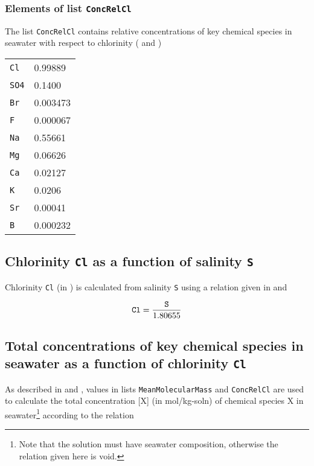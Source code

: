 \documentclass[a4paper]{article}
\begin{document}
\subsubsection{Elements of list \texttt{ConcRelCl}}
The list \texttt{ConcRelCl} contains relative concentrations of key chemical species in seawater with respect to chlorinity (\citet[chap. 5, p. 11]{DOE1994} and \citet[chap. 5, p. 10]{Dickson2007})\\
\begin{center}
\begin{tabular}{|ll|} \hline
\texttt{Cl}  & 0.99889\\
\texttt{SO4} & 0.1400\\
\texttt{Br}  & 0.003473\\
\texttt{F}   & 0.000067\\
\texttt{Na}  & 0.55661\\
\texttt{Mg}  & 0.06626\\
\texttt{Ca}  & 0.02127\\
\texttt{K}   & 0.0206\\
\texttt{Sr}  & 0.00041\\
\texttt{B}   & 0.000232\\ \hline
\end{tabular}
\end{center}

\subsection{Chlorinity \texttt{Cl} as a function of salinity \texttt{S}}
Chlorinity \texttt{Cl} (in \permil) is calculated from salinity \texttt{S} using a relation given in \citet[chap. 5, p. 11]{DOE1994} and \citet[p. 100]{Zeebe2001}

\begin{equation}
\rm \mbox{\texttt{Cl}} = \frac{\mbox{\texttt{S}}}{1.80655}
\end{equation}

\subsection{Total concentrations of key chemical species in seawater as a function of chlorinity \texttt{Cl}}
As described in \citet[chap. 5, p. 11]{DOE1994} and \citet[chap. 5, p. 10]{Dickson2007}, values in lists \texttt{MeanMolecularMass} and \texttt{ConcRelCl} are used to calculate the total concentration [X] (in mol/kg-soln) of chemical species X in seawater\footnote{Note that the solution must have seawater composition, otherwise the relation given here is void.} according to the relation
\end{document}
